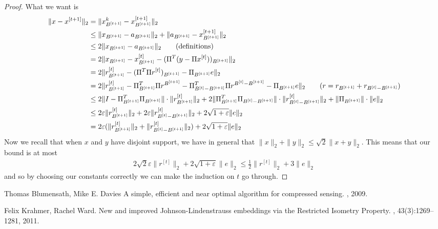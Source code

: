 \documentclass[11pt]{article}
\newcommand{\ep}{\varepsilon}
\begin{document}
\begin{proof}
What we want is
\begin{align*}
\|x - x^{[t+1]}\|_2 &= \|x^k_{B^{[t+1]}} - x^{[t+1]}_{B^{[t+1]}}\|_2 \\
	&\leq \|x_{B^{[t+1]}} - a_{B^{[t+1]}}\|_2 + \|a_{B^{[t+1]}} - x^{[t+1]}_{B^{[t+1]}} \|_2 \\
	&\leq 2\|x_{B^{[t+1]}} - a_{B^{[t+1]}}\|_2 \tag{definitions} \\
	&= 2 \|x_{B^{[t+1]}} - x^{[t]}_{B^{[t+1]}} - (\Pi^T(y - \Pi x^{[t]}))_{B^{[t+1]}} \|_2 \\
	&= 2 \| r^{[t]}_{B^{[t+1]}} - (\Pi^T \Pi r^{[t]})_{B^{[t+1]}} - \Pi_{B^{[t+1]}}e \|_2 \\
	&= 2 \| r^{[t]}_{B^{[t+1]}} - \Pi^T_{B^{[t+1]}} \Pi r^{B^{[t+1]}} - \Pi^T_{B^{[t]} - B^{[t+1]}} \Pi r^{B^{[t]} - B^{[t+1]}} - \Pi_{B^{[t+1]}}e \|_2 \tag{$r = r_{B^{[t+1]}} + r_{B^{[t]} - B^{[t+1]}}$} \\
	&\leq 2 \| I -  \Pi^T_{B^{[t+1]}}  \Pi_{B^{[t+1]}} \| \cdot \| r^{[t]}_{B^{[t+1]}} \|_2
		+ 2\|  \Pi^T_{B^{[t+1]}} \Pi_{B^{[t]} - B^{[t+1]}} \| \cdot \| r^{[t]}_{B^{[t]} - B^{[t+1]}}\|_2 + \| \Pi_{B^{[t+1]}} \| \cdot \|e\|_2 \\
	&\leq 2 \ep \| r^{[t]}_{B^{[t+1]}}\|_2 + 2\ep \|r^{[t]}_{B^{[t]} - B^{[t+1]}}\|_2 + 2\sqrt{1 + \ep} \|e\|_2 \\
	&= 2\ep (\| r^{[t]}_{B^{[t+1]}}\|_2 + \|r^{[t]}_{B^{[t]} - B^{[t+1]}}\|_2) + 2 \sqrt{1 + \ep} \|e\|_2
\end{align*}
Now we recall that when $x$ and $y$ have disjoint support, we have in general that $\|x\|_2 + \|y\|_2 \leq \sqrt{2} \|x+y\|_2$. This means that our bound is at most
\begin{align*}
2\sqrt{2} \ep \|r^{[t]}\|_2 + 2 \sqrt{1+\ep} \|e\|_2 \leq \frac{1}{2} \|r^{[t]}\|_2 + 3 \|e\|_2
\end{align*}
and so by choosing our constants correctly we can make the induction on $t$ go through.
\end{proof}




\begin{thebibliography}{42}
Thomas Blumensath, Mike E. Davies
\newblock A simple, efficient and near optimal algorithm for compressed sensing.
, 2009.

Felix Krahmer, Rachel Ward.
\newblock New and improved Johnson-Lindenstrauss embeddings via the Restricted Isometry Property.
, 43(3):1269--1281, 2011.
\end{thebibliography}
\end{document}
